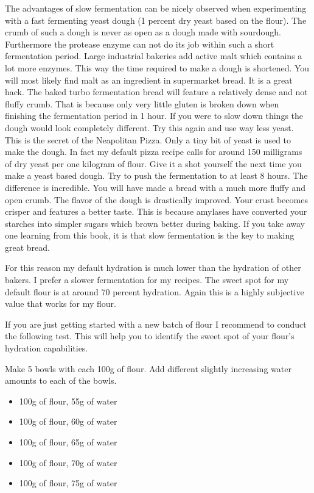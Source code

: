 The advantages of slow fermentation can be nicely observed when experimenting
with a fast fermenting yeast dough (1 percent dry yeast based on the flour). The
crumb of such a dough is never as
open as a dough made with sourdough. Furthermore the protease enzyme
can not do its job within such a short fermentation period.
Large industrial bakeries add active malt which contains a
lot more enzymes. This way the time required to make a dough is shortened. You
will most likely find malt as an ingredient in supermarket bread. It is a
great hack. The baked turbo fermentation bread will feature a relatively dense
and not fluffy crumb. That is because only very little gluten is broken down when
finishing the fermentation period in 1 hour. If you were to slow down things
the dough would look completely different.
Try this again and use way less yeast. This is the
secret of the Neapolitan Pizza. Only a tiny bit of yeast is used to make the
dough. In fact my default pizza recipe calls for around 150 milligrams of dry
yeast per one kilogram of flour. Give it a shot yourself the next time you
make a yeast based dough. Try to push the fermentation to at least 8 hours.
The difference is incredible. You will have made a bread with a much more
fluffy and open crumb. The flavor of the dough is drastically improved. Your
crust becomes crisper and features a better taste. This is because amylases have
converted your starches into simpler sugars which brown better during baking.
If you take away one learning from this book, it is that slow fermentation is
the key to making great bread.

For this reason my default hydration is much lower than the hydration of other
bakers. I prefer a slower fermentation for my recipes.
The sweet spot for my default flour is at around 70 percent hydration.
Again this is a highly subjective value that works for my flour.

If you are just getting started with a new batch of flour
I recommend to conduct the following test. This will help you to
identify the sweet spot of your flour's hydration capabilities.

Make 5 bowls with each 100g of flour. Add different slightly increasing 
water amounts to each of the bowls.

\begin{itemize}
  \item 100g of flour, 55g of water
  \item 100g of flour, 60g of water
  \item 100g of flour, 65g of water
  \item 100g of flour, 70g of water
  \item 100g of flour, 75g of water
\end{itemize}

